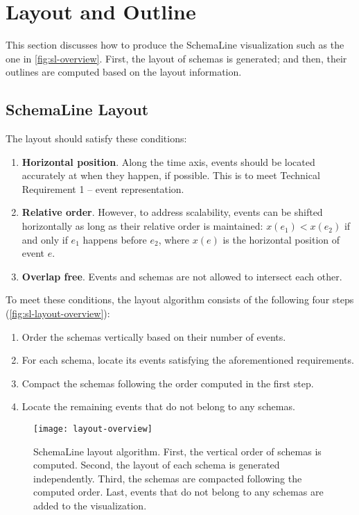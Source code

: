 \section{Layout and Outline}
\label{sec:sl-algorithm}
This section discusses how to produce the SchemaLine visualization such as the one in \autoref{fig:sl-overview}. First, the layout of schemas is generated; and then, their outlines are computed based on the layout information.

\subsection{SchemaLine Layout}
The layout should satisfy these conditions: 
\begin{enumerate}
	\item \textbf{Horizontal position}. Along the time axis, events should be located accurately at when they happen, if possible. This is to meet Technical Requirement 1 -- event representation.
	\item \textbf{Relative order}. However, to address scalability, events can be shifted horizontally as long as their relative order is maintained: $x(e_1) < x(e_2)$ if and only if $e_1$ happens before $e_2$, where $x(e)$ is the horizontal position of event $e$.
	\item \textbf{Overlap free}. Events and schemas are not allowed to intersect each other.
\end{enumerate}

To meet these conditions, the layout algorithm consists of the following four steps (\autoref{fig:sl-layout-overview}):
\begin{enumerate} 
	\item Order the schemas vertically based on their number of events.
	\item For each schema, locate its events satisfying the aforementioned requirements.
	\item Compact the schemas following the order computed in the first step.
	\item Locate the remaining events that do not belong to any schemas. 
\end{enumerate}

\begin{figure}[!htb]
\centering
\texttt{[image: layout-overview]}
\caption{SchemaLine layout algorithm. First, the vertical order of schemas is computed. Second, the layout of each schema is generated independently. Third, the schemas are compacted following the computed order. Last, events that do not belong to any schemas are added to the visualization.}
\label{fig:sl-layout-overview}
\end{figure}

